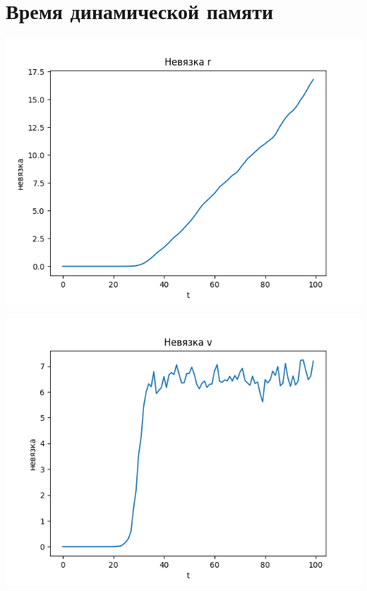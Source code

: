 \documentclass[a4paper, 12pt]{article}
\begin{document}
\part{Время динамической памяти}

\begin{minipage}{0.47\textwidth}
\begin{center}
\includegraphics[scale=0.6]{r_div2}
\end{center}
\end{minipage}
\begin{minipage}{0.47\textwidth}
\begin{center}
\includegraphics[scale=0.6]{v_div2}
\end{center}
\end{minipage}
\end{document}
